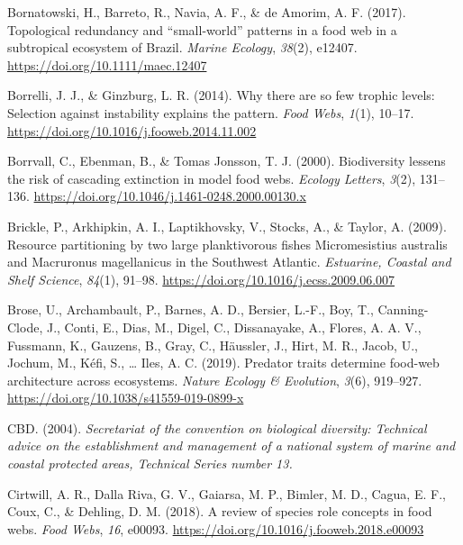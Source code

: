 \documentclass[preprint, 3p,
authoryear]{elsarticle} %
\newlength{\cslhangindent}
\newlength{\cslentryspacingunit} %
\newenvironment{CSLReferences}[2] %
 {%
  \setlength{\parindent}{0pt}
  \ifodd #1
  \let\oldpar\par
  \def\par{\hangindent=\cslhangindent\oldpar}
  \fi
  \setlength{\parskip}{#2\cslentryspacingunit}
 }%
 {}
\begin{document}
\begin{CSLReferences}{1}{0}
\leavevmode{}%
Bornatowski, H., Barreto, R., Navia, A. F., \& de Amorim, A. F. (2017).
Topological redundancy and {``small-world''} patterns in a food web in a
subtropical ecosystem of {Brazil}. \emph{Marine Ecology}, \emph{38}(2),
e12407. \url{https://doi.org/10.1111/maec.12407}

\leavevmode{}%
Borrelli, J. J., \& Ginzburg, L. R. (2014). Why there are so few trophic
levels: {Selection} against instability explains the pattern. \emph{Food
Webs}, \emph{1}(1), 10--17.
\url{https://doi.org/10.1016/j.fooweb.2014.11.002}

\leavevmode{}%
Borrvall, C., Ebenman, B., \& Tomas Jonsson, T. J. (2000). Biodiversity
lessens the risk of cascading extinction in model food webs.
\emph{Ecology Letters}, \emph{3}(2), 131--136.
\url{https://doi.org/10.1046/j.1461-0248.2000.00130.x}

\leavevmode{}%
Brickle, P., Arkhipkin, A. I., Laptikhovsky, V., Stocks, A., \& Taylor,
A. (2009). Resource partitioning by two large planktivorous fishes
{Micromesistius} australis and {Macruronus} magellanicus in the
{Southwest Atlantic}. \emph{Estuarine, Coastal and Shelf Science},
\emph{84}(1), 91--98. \url{https://doi.org/10.1016/j.ecss.2009.06.007}

\leavevmode{}%
Brose, U., Archambault, P., Barnes, A. D., Bersier, L.-F., Boy, T.,
Canning-Clode, J., Conti, E., Dias, M., Digel, C., Dissanayake, A.,
Flores, A. A. V., Fussmann, K., Gauzens, B., Gray, C., Häussler, J.,
Hirt, M. R., Jacob, U., Jochum, M., Kéfi, S., \ldots{} Iles, A. C.
(2019). Predator traits determine food-web architecture across
ecosystems. \emph{Nature Ecology \& Evolution}, \emph{3}(6), 919--927.
\url{https://doi.org/10.1038/s41559-019-0899-x}

\leavevmode{}%
CBD. (2004). \emph{Secretariat of the convention on biological
diversity: {Technical} advice on the establishment and management of a
national system of marine and coastal protected areas, {Technical
Series} number 13.}

\leavevmode{}%
Cirtwill, A. R., Dalla Riva, G. V., Gaiarsa, M. P., Bimler, M. D.,
Cagua, E. F., Coux, C., \& Dehling, D. M. (2018). A review of species
role concepts in food webs. \emph{Food Webs}, \emph{16}, e00093.
\url{https://doi.org/10.1016/j.fooweb.2018.e00093}


\end{CSLReferences}
\end{document}
